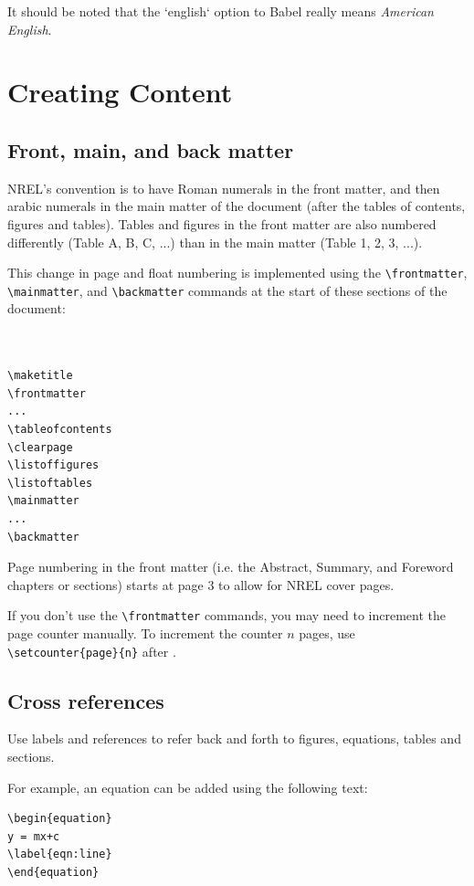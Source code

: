 It should be noted that the `english` option to Babel really means \emph{American English}.

\section{Creating Content}
\subsection{Front, main, and back matter}
NREL's convention is to have Roman numerals in the front matter, and then arabic numerals in the main matter of the document (after the tables of contents, figures and tables). Tables and figures in the front matter are also numbered differently (Table A, B, C, ...) than in the main matter (Table 1, 2, 3, ...).

This change in page and float numbering is implemented using the \verb+\frontmatter+, \verb+\mainmatter+, and \verb+\backmatter+ commands at the start of these sections of the document:

\begin{lstlisting}


\maketitle
\frontmatter
...
\tableofcontents
\clearpage
\listoffigures
\listoftables
\mainmatter
...
\backmatter

\end{lstlisting}

Page numbering in the front matter (i.e. the Abstract, Summary, and Foreword chapters or sections) starts at page 3 to allow for NREL cover pages.

If you don't use the \verb+\frontmatter+ commands, you may need to increment the page counter manually. To increment the counter $n$ pages, use \verb+\setcounter{page}{n}+ after \verb++.

\subsection{Cross references}
Use labels and references to refer back and forth to figures, equations, tables and sections. 

For example, an equation can be added using the following text:

\begin{lstlisting}
\begin{equation}
y = mx+c
\label{eqn:line}
\end{equation}
\end{lstlisting}

